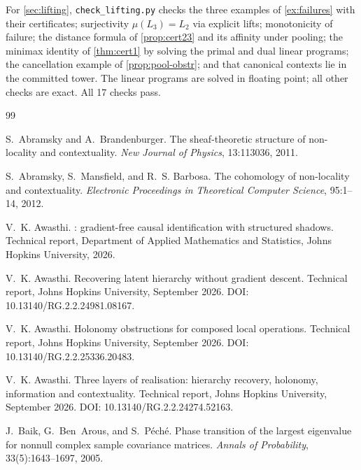 \documentclass[11pt]{article}
\theoremstyle{definition}
\theoremstyle{remark}
\begin{document}
For \cref{sec:lifting}, \texttt{check\_lifting.py} checks the three examples of
\cref{ex:failures} with their certificates; surjectivity $\mu(L_3)=L_2$ via explicit lifts;
monotonicity of failure; the distance formula of \cref{prop:cert23} and its affinity under pooling;
the minimax identity of \cref{thm:cert1} by solving the primal and dual linear programs; the
cancellation example of \cref{prop:pool-obstr}; and that canonical contexts lie in the committed
tower. The linear programs are solved in floating point; all other checks are exact. All 17 checks
pass.

\begin{thebibliography}{99}

S.~Abramsky and A.~Brandenburger.
\newblock The sheaf-theoretic structure of non-locality and contextuality.
\newblock \emph{New Journal of Physics}, 13:113036, 2011.

S.~Abramsky, S.~Mansfield, and R.~S. Barbosa.
\newblock The cohomology of non-locality and contextuality.
\newblock \emph{Electronic Proceedings in Theoretical Computer Science}, 95:1--14, 2012.

V.~K. Awasthi.
: gradient-free causal identification with structured shadows.
\newblock Technical report, Department of Applied Mathematics and Statistics, Johns Hopkins
  University, 2026.

V.~K. Awasthi.
\newblock Recovering latent hierarchy without gradient descent.
\newblock Technical report, Johns Hopkins University, September 2026.
\newblock DOI: 10.13140/RG.2.2.24981.08167.

V.~K. Awasthi.
\newblock Holonomy obstructions for composed local operations.
\newblock Technical report, Johns Hopkins University, September 2026.
\newblock DOI: 10.13140/RG.2.2.25336.20483.

V.~K. Awasthi.
\newblock Three layers of realisation: hierarchy recovery, holonomy, information and contextuality.
\newblock Technical report, Johns Hopkins University, September 2026.
\newblock DOI: 10.13140/RG.2.2.24274.52163.

J.~Baik, G.~Ben~Arous, and S.~P\'ech\'e.
\newblock Phase transition of the largest eigenvalue for nonnull complex sample covariance matrices.
\newblock \emph{Annals of Probability}, 33(5):1643--1697, 2005.


\end{thebibliography}
\end{document}
